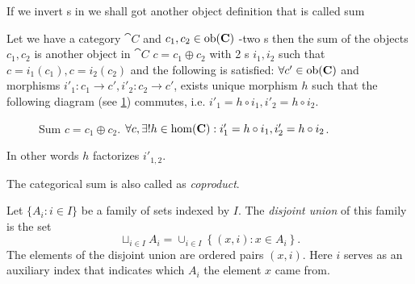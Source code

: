 If we invert s in  we shall
got another 
object definition that is called sum

\begin{definition}[Sum]
\label{def:sum}
Let we have a category $\cat{C}$ and $c_1, c_2 \in \mathrm{ob}(\mathbf{C})$ -two
s then the sum of the objects $c_1, c_2$ is
another object in $\cat{C}$ $c = c_1 \oplus c_2$ with 2
s $i_1, i_2$ such that $c = i_1(c_1), c = i_2
(c_2)$ and the 
following  is satisfied: $\forall c'
\in \mathrm{ob}(\mathbf{C})$ 
and morphisms $i'_1: c_1 \to c', i'_2: c_2 \to c'$, exists unique
morphism $h$ such that the following diagram (see \cref{fig:sum})
commutes, i.e. $i'_1 = h \circ i_1, i'_2 = h \circ i_2$.
\begin{figure}[H]
  \centering
  \caption{Sum $c = c_1 \oplus c_2$. $\forall c, \exists! h \in
    \mathrm{hom}(\mathbf{C}): i'_1 = h \circ i_1, i'_2 = h \circ i_2 $.}
  \label{fig:sum}
\end{figure}
In other words $h$ factorizes $i'_{1,2}$.

The categorical sum is also called as \textit{coproduct}.
\end{definition}

\begin{definition}
  \label{def:disjoint_union}
  Let $\{A_i: i \in I\}$ be a family of sets 
  indexed by $I$. The 
  \textit{disjoint union} \cite{wiki:disjointunion} of this family is
  the set 
  \[
  \sqcup_{i \in I} A_i = \cup_{i \in I}\left\{
  \left(x, i\right): x \in A_i
  \right\}.
  \]
  The elements of the disjoint union are ordered pairs $(x, i)$. Here $i$
  serves as an auxiliary index that indicates which $A_i$ the element $x$
  came from.
\end{definition}

